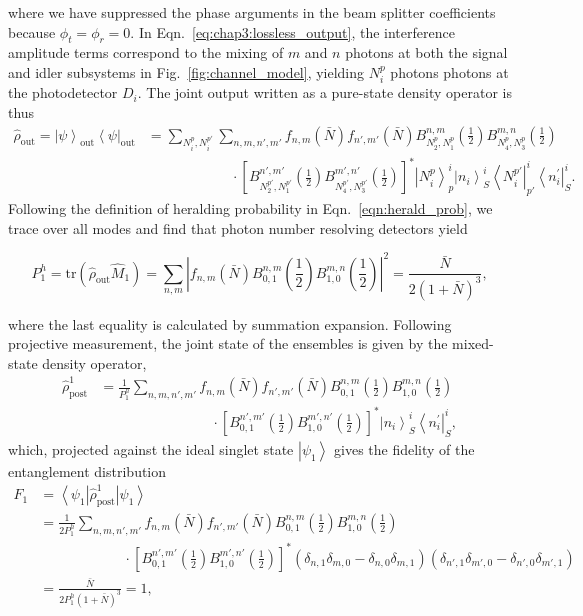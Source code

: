 \documentclass[aps,twocolumn,secnumarabic,amsmath,amssymb,pra,groupedaddress,
showpacs, showkeys]{revtex4-1}
\newcommand{\bra}[1]{\left\langle #1 \right|}
\newcommand{\ket}[1]{\left|#1\right\rangle}
\newcommand{\pna}[1]{\left(#1\right)}
\newcommand{\pnb}[1]{\left[#1\right]}
\newcommand{\eqn}[1]{
\begin{equation}
	#1
\end{equation}
}
\newcommand{\abs}[1]{\left|#1\right|}
\begin{document}
where we have suppressed the phase arguments in the beam splitter coefficients
because $\phi_t=\phi_r=0$. In Eqn.~\ref{eq:chap3:lossless_output}, the
interference amplitude terms correspond to the mixing of $m$ and $n$ photons at
both the signal and idler subsystems in Fig.~\ref{fig:channel_model}, yielding
$N^p_i$ photons photons at the photodetector $D_i$. The joint output written as
a pure-state density operator is thus
\begin{align}
\hat{\rho}_{\textrm{out}} =\ket{\psi}_{\textrm{out}} \bra{\psi}_{\textrm{out}} & =\sum_{N_i^p, N_i^{p\prime}}\sum_{n,m,n',m'} f_{n,m}\pna{\bar{N}}f_{n',m'}\pna{\bar{N}} B_{N_2^p,N_1^p}^{n,m}\pna{\frac{1}{2}}  
B_{N_4^p,N_3^p}^{m,n}\pna{\frac{1}{2}} \nonumber \\
& \qquad\qquad\qquad\cdot  \pnb{B_{N_2^{p\prime},N_1^{p\prime}}^{n',m'}\pna{\frac{1}{2}}  
B_{N_4^{p\prime},N_3^{p\prime}}^{m',n'}\pna{\frac{1}{2}}}^*\ket{N_i^{p}}^i_p\ket{n_i}^i_S\bra{N_i^{p\prime}}^i_{p\prime}\bra{n_i^{\prime}}^i_S .\label{eqn:joint_state_lossless}
\end{align}
Following the definition of heralding probability in
Eqn.~\ref{eqn:herald_prob}, we trace over all modes and find that photon number
resolving detectors yield
\eqn{
	P_{1}^{h}=\textrm{tr}\pna{\hat{\rho}_{\textrm{out}} \hat{M}_{1}} = \sum_{n,m} \abs{f_{n,m}\pna{\bar{N}} 
		B_{0,1}^{n,m}\pna{\frac{1}{2}} B_{1,0}^{m,n}\pna{\frac{1}{2}}}^2 =\frac{\bar{N}}{2\pna{1+\bar{N}}^3},\label{eq:chap3:lossless_prob}
}
where the last equality is calculated by summation expansion. Following
projective measurement, the joint state of the ensembles is given by the
mixed-state density operator,
\begin{align}
\hat{\rho}_{\textrm{post}}^{1} & = \frac{1}{P_{1}^{h}}\sum_{n,m,n',m'} f_{n,m}\pna{\bar{N}}f_{n',m'}\pna{\bar{N}} B_{0,1}^{n,m}\pna{\frac{1}{2}}  
B_{1,0}^{m,n}\pna{\frac{1}{2}} \nonumber \\
& \qquad\qquad\qquad\qquad \cdot \pnb{B_{0,1}^{n',m'}\pna{\frac{1}{2}}  
B_{1,0}^{m',n'}\pna{\frac{1}{2}}}^*\ket{n_i}^i_S\bra{n_i^{\prime}}^i_S,\label{eqn:post:lossless}
\end{align}
which, projected against the ideal singlet state $\ket{\psi_{1}}$ gives the
fidelity of the entanglement distribution
\begin{align}
	F_{1}&=\bra{\psi_{1}}\hat{\rho}_{\textrm{post}}^{1} \ket{\psi_{1}} \nonumber \\
		& = \frac{1}{2P_{1}^{h}}\sum_{n,m,n',m'} f_{n,m}\pna{\bar{N}}f_{n',m'}\pna{\bar{N}} B_{0,1}^{n,m}\pna{\frac{1}{2}}  
		B_{1,0}^{m,n}\pna{\frac{1}{2}}\nonumber \\ 
		& \qquad \qquad \qquad \cdot \pnb{B_{0,1}^{n',m'}\pna{\frac{1}{2}} B_{1,0}^{m',n'}\pna{\frac{1}{2}}}^*\pna{\delta_{n,1}\delta_{m,0}-\delta_{n,0}\delta_{m,1}}\pna{\delta_{n',1}\delta_{m',0}-\delta_{n',0}\delta_{m',1}} \nonumber \\
		& = \frac{\bar{N}}{2P_{1}^{h}\pna{1+\bar{N}}^3}=1,
\end{align}
\end{document}
